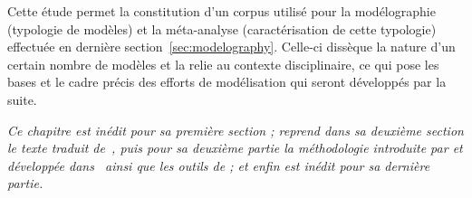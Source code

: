 Cette étude permet la constitution d'un corpus utilisé pour la modélographie (typologie de modèles) et la méta-analyse (caractérisation de cette typologie) effectuée en dernière section~\ref{sec:modelography}. Celle-ci dissèque la nature d'un certain nombre de modèles et la relie au contexte disciplinaire, ce qui pose les bases et le cadre précis des efforts de modélisation qui seront développés par la suite.







\stars


\textit{Ce chapitre est inédit pour sa première section ; reprend dans sa deuxième section le texte traduit de~\cite{raimbault2015models}, puis pour sa deuxième partie la méthodologie introduite par \cite{raimbault2016indirect} et développée dans~\cite{raimbault2017exploration} ainsi que les outils de \cite{bergeaud2017classifying} ; et enfin est inédit pour sa dernière partie.}





